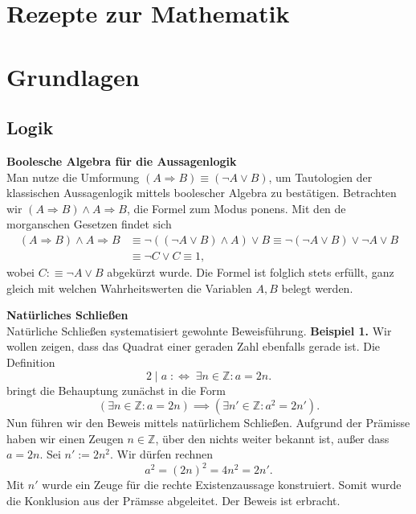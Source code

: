 \documentclass[paper=180mm:225mm,pagesize=auto,fleqn,twoside,11pt,dvipdfmx]{scrartcl}
\theoremstyle{rmbox}
\newenvironment{Rezept}[1]{\strong{#1}\\}{}
\newcommand{\strong}[1]{\textsf{\textbf{#1}}}
\newcommand{\Z}{\mathbb Z}
\newcommand{\defiff}{\;:\Longleftrightarrow\;}
\begin{document}
\thispagestyle{empty}

\section*{\LARGE Rezepte zur Mathematik}

\tableofcontents

\clearpage
\section{Grundlagen}

\subsection{Logik}

\begin{Rezept}{Boolesche Algebra für die Aussagenlogik}
Man nutze die Umformung $(A\Rightarrow B)\equiv (\neg A\lor B)$,
um Tautologien der klassischen Aussagenlogik mittels boolescher
Algebra zu bestätigen.
\end{Rezept}
Betrachten wir $(A\Rightarrow B)\land A\Rightarrow B$,
die Formel zum Modus ponens. Mit den de morganschen Gesetzen
findet sich
\begin{align*}
(A\Rightarrow B)\land A\Rightarrow B
&\equiv \neg ((\neg A\lor B)\land A)\lor B
\equiv \neg (\neg A\lor B)\lor\neg A\lor B\\
&\equiv \neg C\lor C \equiv 1,
\end{align*}
wobei $C :\equiv \neg A\lor B$ abgekürzt wurde.
Die Formel ist folglich stets erfüllt, ganz gleich mit welchen
Wahrheitswerten die Variablen $A,B$ belegt werden.

\begin{Rezept}{Natürliches Schließen}
Natürliche Schließen systematisiert gewohnte Beweisführung.
\end{Rezept}
\strong{Beispiel 1.}
Wir wollen zeigen, dass das Quadrat einer geraden Zahl ebenfalls
gerade ist. Die Definition
\[2\mid a \defiff \exists n\in\Z\colon a = 2n.\]
bringt die Behauptung zunächst in die Form
\[(\exists n\in\Z\colon a = 2n) \implies (\exists n'\in\Z\colon a^2 = 2n').\]
Nun führen wir den Beweis mittels natürlichem Schließen. Aufgrund
der Prämisse haben wir einen Zeugen $n\in\Z$, über den nichts
weiter bekannt ist, außer dass $a=2n$. Sei $n':=2n^2$. Wir dürfen
rechnen
\[a^2 = (2n)^2 = 4n^2 = 2n'.\]
Mit $n'$ wurde ein Zeuge für die rechte Existenzaussage konstruiert.
Somit wurde die Konklusion aus der Prämsse abgeleitet. Der Beweis
ist erbracht.
\end{document}
